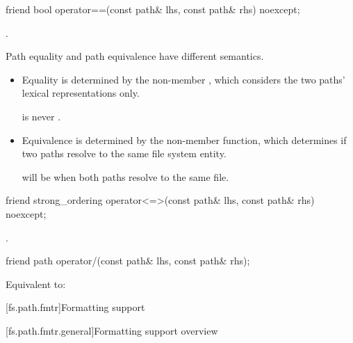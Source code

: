 %
\begin{itemdecl}
friend bool operator==(const path& lhs, const path& rhs) noexcept;
\end{itemdecl}

\begin{itemdescr}
\pnum
\returns
{}.

\pnum
\begin{note}
Path equality and path equivalence have different semantics.
\begin{itemize}
\item Equality is determined by the  non-member ,
which considers the two paths' lexical representations only.
\begin{example}
 is never .
\end{example}
\item Equivalence is determined by the  non-member function, which
determines if two paths resolve to the same file system entity.
\begin{example}
 will be  when both paths resolve to the same file.
\end{example}
\end{itemize}
\end{note}
\end{itemdescr}

%
\begin{itemdecl}
friend strong_ordering operator<=>(const path& lhs, const path& rhs) noexcept;
\end{itemdecl}

\begin{itemdescr}
\pnum
\returns
{}.
\end{itemdescr}

%
\begin{itemdecl}
friend path operator/(const path& lhs, const path& rhs);
\end{itemdecl}

\begin{itemdescr}
\pnum
\effects
Equivalent to: 
\end{itemdescr}

[fs.path.fmtr]{Formatting support}

[fs.path.fmtr.general]{Formatting support overview}

